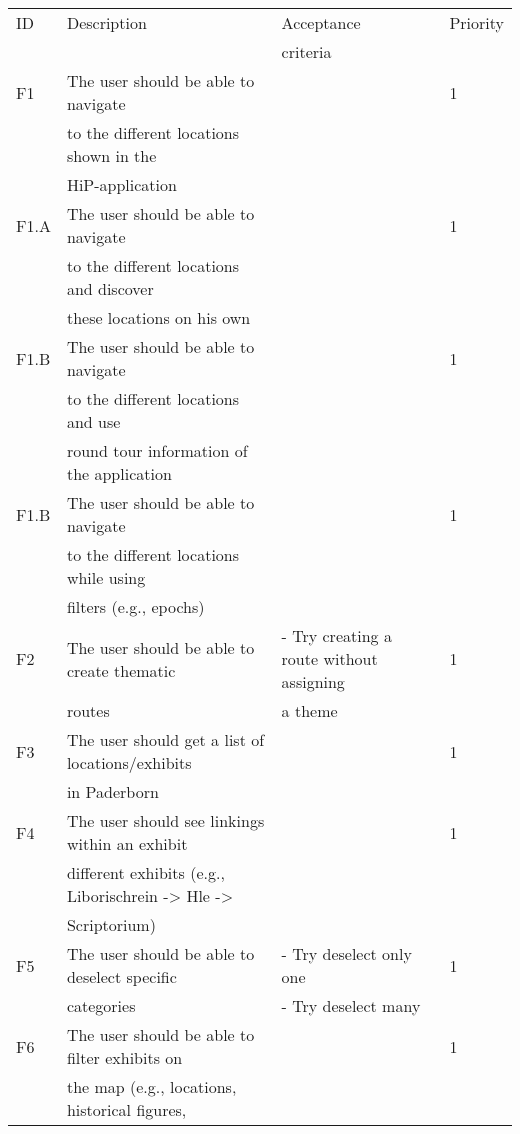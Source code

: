 \begin{table}[h]
\centering%
\begin{tabular}{llll}
	\toprule
ID 	& Description 	& Acceptance 	& Priority \\
 	& 			 & criteria 	&  \\
\cmidrule(rl){1-1}\cmidrule(rl){2-2}\cmidrule(rl){3-3}\cmidrule(rl){4-4}
F1 & The user should be able to navigate 		&  		& 1\\
 	& to the different locations shown in the 		&  		& \\
	& HiP-application 						&		&	\\
\hline
F1.A & The user should be able to navigate 		&  		& 1\\
 	& to the different locations and discover 		&  		& \\
	& these locations on his own 				&		&	\\
\hline
F1.B & The user should be able to navigate 		&  		& 1\\
 	& to the different locations and use 		&  		& \\
	& round tour information of the application 	&		&	\\
	\hline
F1.B & The user should be able to navigate 		& 	 	& 1\\
 	& to the different locations while using  		&  		& \\
	& filters (e.g., epochs)					&		&	\\
\hline
F2 & The user should be able to create thematic 	& - Try creating a route without assigning & 1\\
	& routes 								& a theme & \\
\hline
F3 & The user should get a list of locations/exhibits 	&  	& 1\\
	& in Paderborn								&	& \\
\hline
F4 & The user should see linkings within an exhibit  	&  	& 1\\
	& different exhibits (e.g., Liborischrein -> Hle ->	&	& \\
	& Scriptorium) 								&	& \\
\hline
F5 & The user should be able to deselect specific 	& - Try deselect only one & 1\\
	& categories 							& - Try deselect many	& \\
\hline
F6 & The user should be able to filter exhibits on  &  	& 1\\
	& the map (e.g., locations, historical figures, &	& \\

\end{tabular}
\end{table}
